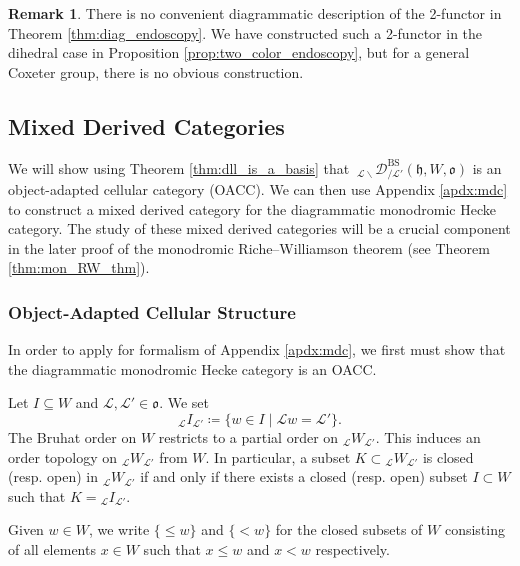 \documentclass{amsart}
\newcommand{\scrL}{\mathcal{L}}
\newcommand{\fr}[1]{\mathfrak{#1}}
\DeclareMathOperator{\BS}{BS}
\newcommand{\EWmon}[2]{\:_{#1 \backslash} \mathcal{D}_{/ #2} }
\newcommand{\W}[2]{{}_{#1}W_{#2}}
\theoremstyle{definition}
\newtheorem{remark}[subsubsection]{Remark}
\numberwithin{equation}{subsection}
\begin{document}
\begin{remark}
    There is no convenient diagrammatic description of the 2-functor in Theorem \ref{thm:diag_endoscopy}. 
    We have constructed such a 2-functor in the dihedral case in Proposition \ref{prop:two_color_endoscopy}, but for a general Coxeter group, there is no obvious construction.
\end{remark}

\subsection{Mixed Derived Categories}\label{subsec:mixed_diagrammatic_cat}

We will show using Theorem \ref{thm:dll_is_a_basis} that $\EWmon{\scrL}{\scrL'}^{\BS} (\fr{h}, W, \fr{o})$ is an object-adapted cellular category (OACC).
We can then use Appendix \ref{apdx:mdc} to construct a mixed derived category for the diagrammatic monodromic Hecke category.
The study of these mixed derived categories will be a crucial component in the later proof of the monodromic Riche--Williamson theorem (see Theorem \ref{thm:mon_RW_thm}).

\subsubsection{Object-Adapted Cellular Structure}

In order to apply for formalism of Appendix \ref{apdx:mdc}, we first must show that the diagrammatic monodromic Hecke category is an OACC.

Let $I \subseteq W$ and $\scrL, \scrL' \in \fr{o}$. We set
\[ {}_{\scrL} I_{\scrL'} \coloneq \{ w \in I \mid \scrL w = \scrL'\}.\]
The Bruhat order on $W$ restricts to a partial order on $\W{\scrL}{\scrL'}$.
This induces an order topology on $\W{\scrL}{\scrL'}$ from $W$. In particular, a subset $K \subset \W{\scrL}{\scrL'}$ is closed (resp. open) in $\W{\scrL}{\scrL'}$ if and only if there exists a closed (resp. open) subset $I \subset W$ such that $K = {}_{\scrL} I_{\scrL'}$.

Given $w \in W$, we write $\{ \leq w \}$ and $\{ < w\}$ for the closed subsets of $W$ consisting of all elements $x\in W$ such that $x \leq w$ and $x < w$ respectively.
\end{document}
